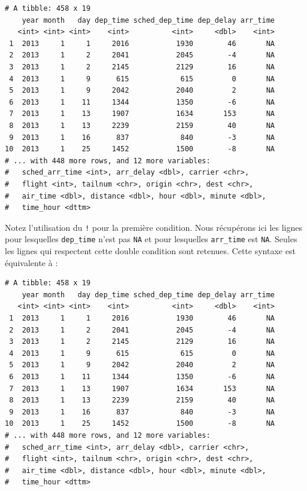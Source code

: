 \documentclass[
  a4paper,
]{article}
\newenvironment{Shaded}{\begin{snugshade}}{\end{snugshade}}
\newcommand{\KeywordTok}[1]{\textcolor[rgb]{0.12,0.11,0.11}{\textbf{#1}}}
\newcommand{\NormalTok}[1]{\textcolor[rgb]{0.12,0.11,0.11}{#1}}
\newcommand{\OperatorTok}[1]{\textcolor[rgb]{0.12,0.11,0.11}{#1}}
\newcommand{\StringTok}[1]{\textcolor[rgb]{0.75,0.01,0.01}{#1}}
\begin{document}
\begin{verbatim}
# A tibble: 458 x 19
    year month   day dep_time sched_dep_time dep_delay arr_time
   <int> <int> <int>    <int>          <int>     <dbl>    <int>
 1  2013     1     1     2016           1930        46       NA
 2  2013     1     2     2041           2045        -4       NA
 3  2013     1     2     2145           2129        16       NA
 4  2013     1     9      615            615         0       NA
 5  2013     1     9     2042           2040         2       NA
 6  2013     1    11     1344           1350        -6       NA
 7  2013     1    13     1907           1634       153       NA
 8  2013     1    13     2239           2159        40       NA
 9  2013     1    16      837            840        -3       NA
10  2013     1    25     1452           1500        -8       NA
# ... with 448 more rows, and 12 more variables:
#   sched_arr_time <int>, arr_delay <dbl>, carrier <chr>,
#   flight <int>, tailnum <chr>, origin <chr>, dest <chr>,
#   air_time <dbl>, distance <dbl>, hour <dbl>, minute <dbl>,
#   time_hour <dttm>
\end{verbatim}

Notez l'utilisation du \texttt{!} pour la première condition. Nous récupérons ici les lignes pour lesquelles \texttt{dep\_time} n'est pas \texttt{NA} et pour lesquelles \texttt{arr\_time} est \texttt{NA}. Seules les lignes qui respectent cette double condition sont retenues. Cette syntaxe est équivalente à :

\begin{Shaded}
\end{Shaded}

\begin{verbatim}
# A tibble: 458 x 19
    year month   day dep_time sched_dep_time dep_delay arr_time
   <int> <int> <int>    <int>          <int>     <dbl>    <int>
 1  2013     1     1     2016           1930        46       NA
 2  2013     1     2     2041           2045        -4       NA
 3  2013     1     2     2145           2129        16       NA
 4  2013     1     9      615            615         0       NA
 5  2013     1     9     2042           2040         2       NA
 6  2013     1    11     1344           1350        -6       NA
 7  2013     1    13     1907           1634       153       NA
 8  2013     1    13     2239           2159        40       NA
 9  2013     1    16      837            840        -3       NA
10  2013     1    25     1452           1500        -8       NA
# ... with 448 more rows, and 12 more variables:
#   sched_arr_time <int>, arr_delay <dbl>, carrier <chr>,
#   flight <int>, tailnum <chr>, origin <chr>, dest <chr>,
#   air_time <dbl>, distance <dbl>, hour <dbl>, minute <dbl>,
#   time_hour <dttm>
\end{verbatim}
\end{document}
